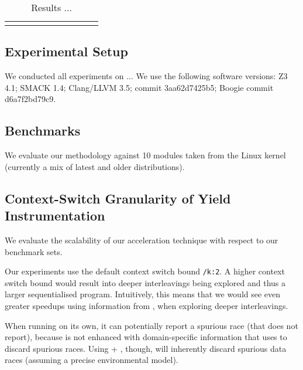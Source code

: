 \newcommand{\colspacing}{\hspace{1.8em}}
\begin{table*}[t]
\small
\centering
\begin{tabular}{l rrr rr rr r r}
\centering

\end{tabular}
\caption{Results ...}
\label{tab:races}
\end{table*}

\subsection{Experimental Setup}
\label{eval:setup}

We conducted all experiments on ... We use the following software versions: Z3 4.1; SMACK 1.4; Clang/LLVM 3.5; \corral commit 3aa62d7425b5; Boogie commit d6a7f2bd79c9.

\subsection{Benchmarks}
\label{eval:benchmarks}

We evaluate our methodology against 10 modules taken from the Linux kernel (currently a mix of latest and older distributions). 

\subsection{Context-Switch Granularity of Yield Instrumentation}
\label{eval:granularity}

We evaluate the scalability of our acceleration technique with respect to our benchmark sets.

Our experiments use the default \corral context switch bound \texttt{/k:2}. A higher context switch bound would result into deeper interleavings being explored and thus a larger sequentialised program. Intuitively, this means that we would see even greater speedups using information from \whoop, when exploring deeper interleavings. 

When running \corral on its own, it can potentially report a spurious race (that \whoop does not report), because \corral is not enhanced with domain-specific information that \whoop uses to discard spurious races. Using \whoop + \corral, though, will inherently discard spurious data races (assuming a precise environmental model).

